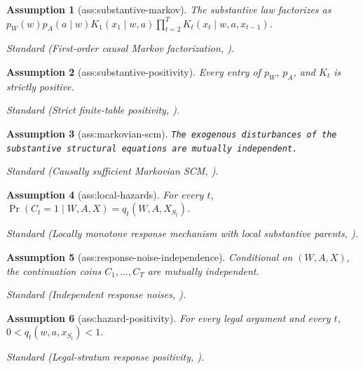 \documentclass{article}
\newtheorem{assumption}{Assumption}
\begin{document}
\begin{assumption}[ass:substantive-markov]\label{ass:substantive-markov}
The substantive law factorizes as \(p_W(w)p_A(a\mid w)K_1(x_1\mid w,a)\prod_{t=2}^T K_t(x_t\mid w,a,x_{t-1})\).
\par\smallskip\noindent\emph{Standard} (First-order causal Markov factorization, \cite{Pearl2009Causality}).
\end{assumption}

\begin{assumption}[ass:substantive-positivity]\label{ass:substantive-positivity}
Every entry of \(p_W\), \(p_A\), and \(K_t\) is strictly positive.
\par\smallskip\noindent\emph{Standard} (Strict finite-table positivity, \cite{TikkaKarvanen2025Monotone}).
\end{assumption}

\begin{assumption}[ass:markovian-scm]\label{ass:markovian-scm}
\texttt{The exogenous disturbances of the substantive structural equations are mutually independent.}
\par\smallskip\noindent\emph{Standard} (Causally sufficient Markovian SCM, \cite{Pearl2009Causality}).
\end{assumption}

\begin{assumption}[ass:local-hazards]\label{ass:local-hazards}
For every \(t\), \(\Pr(C_t=1\mid W,A,X)=q_t(W,A,X_{S_t})\).
\par\smallskip\noindent\emph{Standard} (Locally monotone response mechanism with local substantive parents, \cite{TikkaKarvanen2025Monotone}).
\end{assumption}

\begin{assumption}[ass:response-noise-independence]\label{ass:response-noise-independence}
Conditional on \((W,A,X)\), the continuation coins \(C_1,\ldots,C_T\) are mutually independent.
\par\smallskip\noindent\emph{Standard} (Independent response noises, \cite{TikkaKarvanen2025Monotone}).
\end{assumption}

\begin{assumption}[ass:hazard-positivity]\label{ass:hazard-positivity}
For every legal argument and every \(t\), \(0<q_t(w,a,x_{S_t})<1\).
\par\smallskip\noindent\emph{Standard} (Legal-stratum response positivity, \cite{TikkaKarvanen2025Monotone}).
\end{assumption}
\end{document}
